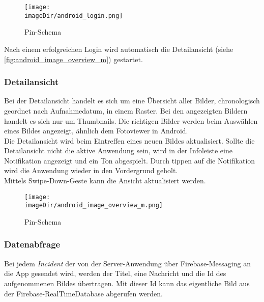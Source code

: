 \begin{figure}[h]
	\centering
	\texttt{[image: \\imageDir/android\_login.png]}
	\caption{Pin-Schema}
	\label{fig:android_login}
\end{figure}

Nach einem erfolgreichen Login wird automatisch die Detailansicht (siehe \autoref{fig:android_image_overview_m}) gestartet.

\pagebreak

\subsubsection{Detailansicht}

Bei der Detailansicht handelt es sich um eine Übersicht aller Bilder, chronologisch geordnet nach Aufnahmedatum, in einem Raster. Bei den angezeigten Bildern handelt es sich nur um Thumbnails. Die richtigen Bilder werden beim Auswählen eines Bildes angezeigt, ähnlich dem Fotoviewer in Android.\\

Die Detailansicht wird beim Eintreffen eines neuen Bildes aktualisiert. Sollte die Detailansicht nicht die aktive Anwendung sein, wird in der Infoleiste eine Notifikation angezeigt und ein Ton abgespielt. Durch tippen auf die Notifikation wird die Anwendung wieder in den Vordergrund geholt.\\

Mittels Swipe-Down-Geste kann die Ansicht aktualisiert werden.

\begin{figure}[h]
	\centering
	\texttt{[image: \\imageDir/android\_image\_overview\_m.png]}
	\caption{Pin-Schema}
	\label{fig:android_image_overview_m}
\end{figure}

\subsubsection{Datenabfrage}

Bei jedem \emph{Incident} der von der Server-Anwendung über Firebase-Messaging an die App gesendet wird, werden der Titel, eine Nachricht und die Id des aufgenommenen Bildes übertragen. Mit dieser Id kann das eigentliche Bild aus der Firebase-RealTimeDatabase abgerufen werden.\\

\begin{code}
	\caption{FirebaseMessaging.java}
	\label{src:FirebaseMessaging}
\end{code}